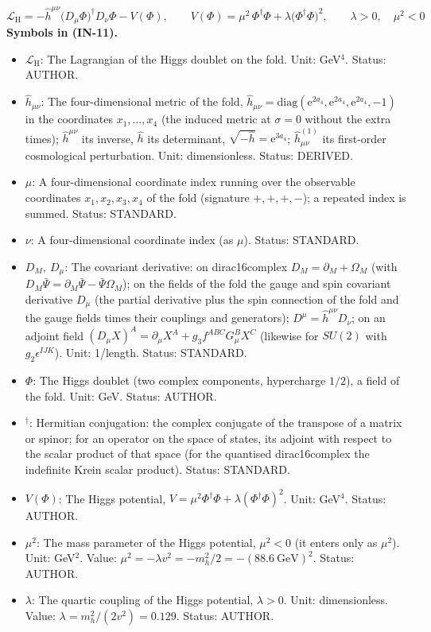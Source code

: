 \documentclass[
  10pt,
]{article}
\providecommand{\tightlist}{%
  \setlength{\itemsep}{0pt}\setlength{\parskip}{0pt}}
\begin{document}
\[
\mathcal{L}_{\mathrm{H}} = -\hat h^{\mu\nu}\big(D_\mu\Phi\big)^\dagger D_\nu\Phi - V(\Phi),\qquad
V(\Phi) = \mu^2\,\Phi^\dagger\Phi + \lambda\big(\Phi^\dagger\Phi\big)^2,\qquad \lambda > 0,\quad \mu^2 < 0 \tag{IN-11}
\] \textbf{Symbols in (IN-11).}

\begin{itemize}
\tightlist
\item
  \(\mathcal{L}_{\mathrm{H}}\): The Lagrangian of the Higgs doublet on
  the fold. Unit: GeV\(^4\). Status: AUTHOR.
\item
  \(\hat h_{\mu\nu}\): The four-dimensional metric of the fold,
  \(\hat h_{\mu\nu} = \mathrm{diag}(\mathrm{e}^{2a_4}, \mathrm{e}^{2a_4}, \mathrm{e}^{2a_4}, -1)\)
  in the coordinates \(x_1, \dots, x_4\) (the induced metric at
  \(\sigma = 0\) without the extra times); \(\hat h^{\mu\nu}\) its
  inverse, \(\hat h\) its determinant,
  \(\sqrt{-\hat h} = \mathrm{e}^{3a_4}\); \(\hat h^{(1)}_{\mu\nu}\) its
  first-order cosmological perturbation. Unit: dimensionless. Status:
  DERIVED.
\item
  \(\mu\): A four-dimensional coordinate index running over the
  observable coordinates \(x_1, x_2, x_3, x_4\) of the fold (signature
  \(+,+,+,-\)); a repeated index is summed. Status: STANDARD.
\item
  \(\nu\): A four-dimensional coordinate index (as \(\mu\)). Status:
  STANDARD.
\item
  \(D_M,\ D_\mu\): The covariant derivative: on dirac16complex
  \(D_M = \partial_M + \Omega_M\) (with
  \(D_M\bar\Psi = \partial_M\bar\Psi - \bar\Psi\Omega_M\)); on the
  fields of the fold the gauge and spin covariant derivative \(D_\mu\)
  (the partial derivative plus the spin connection of the fold and the
  gauge fields times their couplings and generators);
  \(D^\mu = \hat h^{\mu\nu}D_\nu\); on an adjoint field
  \((D_\mu X)^A = \partial_\mu X^A + g_3f^{ABC}G^B_\mu X^C\) (likewise
  for \(SU(2)\) with \(g_2\epsilon^{IJK}\)). Unit: 1/length. Status:
  STANDARD.
\item
  \(\Phi\): The Higgs doublet (two complex components, hypercharge
  \(1/2\)), a field of the fold. Unit: GeV. Status: AUTHOR.
\item
  \({}^\dagger\): Hermitian conjugation: the complex conjugate of the
  transpose of a matrix or spinor; for an operator on the space of
  states, its adjoint with respect to the scalar product of that space
  (for the quantised dirac16complex the indefinite Krein scalar
  product). Status: STANDARD.
\item
  \(V(\Phi)\): The Higgs potential,
  \(V = \mu^2\Phi^\dagger\Phi + \lambda(\Phi^\dagger\Phi)^2\). Unit:
  GeV\(^4\). Status: AUTHOR.
\item
  \(\mu^2\): The mass parameter of the Higgs potential, \(\mu^2 < 0\)
  (it enters only as \(\mu^2\)). Unit: GeV\(^2\). Value:
  \(\mu^2 = -\lambda v^2 = -m_h^2/2 = -(88.6\ \mathrm{GeV})^2\). Status:
  AUTHOR.
\item
  \(\lambda\): The quartic coupling of the Higgs potential,
  \(\lambda > 0\). Unit: dimensionless. Value:
  \(\lambda = m_h^2/(2v^2) = 0.129\). Status: AUTHOR.
\end{itemize}
\end{document}
